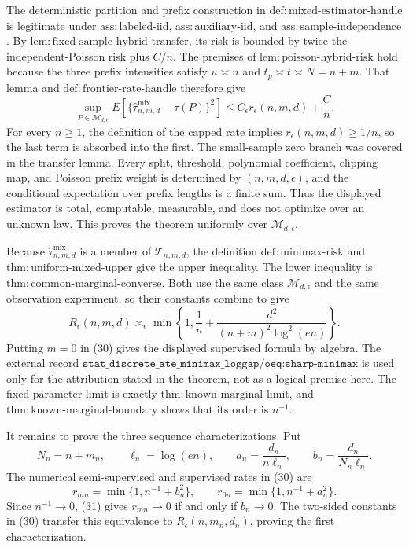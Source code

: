 The deterministic partition and prefix construction in
\(\mathrm{def:mixed\mbox{-}estimator\mbox{-}handle}\) is legitimate
under \(\mathrm{ass:labeled\mbox{-}iid}\),
\(\mathrm{ass:auxiliary\mbox{-}iid}\), and
\(\mathrm{ass:sample\mbox{-}independence}\).  By
\(\mathrm{lem:fixed\mbox{-}sample\mbox{-}hybrid\mbox{-}transfer}\),
its risk is bounded by twice the independent-Poisson risk plus
\(C/n\).  The premises of
\(\mathrm{lem:poisson\mbox{-}hybrid\mbox{-}risk}\) hold because the
three prefix intensities satisfy \(u\asymp n\) and
\(t_p\asymp t\asymp N=n+m\).  That lemma and
\(\mathrm{def:frontier\mbox{-}rate\mbox{-}handle}\) therefore give
\[
 \sup_{P\in\mathcal M_{d,\epsilon}}
 E[\{\widehat\tau^{\mathrm{mix}}_{n,m,d}-\tau(P)\}^2]
 \le C_\epsilon r_\epsilon(n,m,d)+\frac Cn.
\]
For every \(n\ge1\), the definition of the capped rate implies
\(r_\epsilon(n,m,d)\ge1/n\), so the last term is absorbed into the
first.  The small-sample zero branch was covered in the transfer
lemma.  Every split, threshold, polynomial coefficient, clipping map,
and Poisson prefix weight is determined by \((n,m,d,\epsilon)\), and
the conditional expectation over prefix lengths is a finite sum.
Thus the displayed estimator is total, computable, measurable, and
does not optimize over an unknown law.  This proves the theorem
uniformly over \(\mathcal M_{d,\epsilon}\).

Because \(\widehat\tau^{\mathrm{mix}}_{n,m,d}\) is a member of
\(\mathcal T_{n,m,d}\), the definition
\(\mathrm{def:minimax\mbox{-}risk}\) and
\(\mathrm{thm:uniform\mbox{-}mixed\mbox{-}upper}\) give the upper
inequality.  The lower inequality is
\(\mathrm{thm:common\mbox{-}marginal\mbox{-}converse}\).  Both use
the same class \(\mathcal M_{d,\epsilon}\) and the same observation
experiment, so their constants combine to give
\[
 R_\epsilon(n,m,d)\asymp_\epsilon
 \min\!\left\{1,\frac1n+\frac{d^2}{(n+m)^2\log^2(en)}\right\}.     \tag{30}
\]
Putting \(m=0\) in (30) gives the displayed supervised formula by
algebra.  The external record
\(\texttt{stat\_discrete\_ate\_minimax\_loggap/oeq:sharp-minimax}\)
is used only for the attribution stated in the theorem, not as a
logical premise here.  The fixed-parameter limit is exactly
\(\mathrm{thm:known\mbox{-}marginal\mbox{-}limit}\), and
\(\mathrm{thm:known\mbox{-}marginal\mbox{-}boundary}\) shows that its
order is \(n^{-1}\).

It remains to prove the three sequence characterizations.  Put
\[
 N_n=n+m_n,\qquad \ell_n=\log(en),\qquad
 a_n=\frac{d_n}{n\ell_n},\qquad
 b_n=\frac{d_n}{N_n\ell_n}.
\]
The numerical semi-supervised and supervised rates in (30) are
\[
 r_{mn}=\min\{1,n^{-1}+b_n^2\},
 \qquad r_{0n}=\min\{1,n^{-1}+a_n^2\}.             \tag{31}
\]
Since \(n^{-1}\to0\), (31) gives
\(r_{mn}\to0\) if and only if \(b_n\to0\).  The two-sided constants
in (30) transfer this equivalence to \(R_\epsilon(n,m_n,d_n)\), proving
the first characterization.

